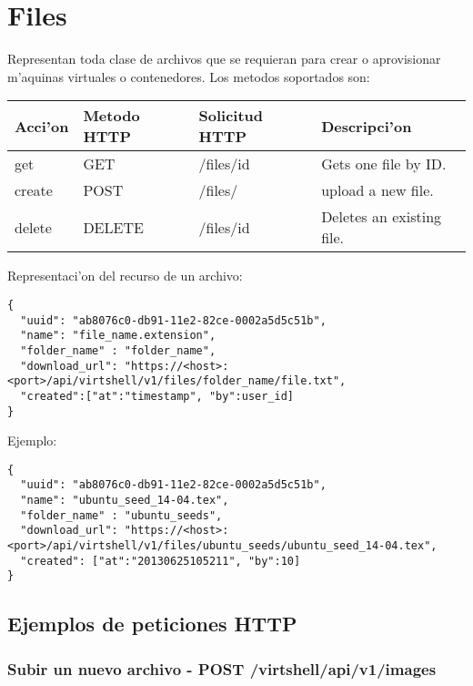 \section{Files}
Representan toda clase de archivos que se requieran para crear o aprovisionar m'aquinas virtuales o contenedores. Los metodos soportados son:

\begin{center}
 \begin{tabular}{| l | l | l | l |}
 \hline
  \rowcolor{blueapi}
  \textbf{Acci'on} & \textbf{Metodo HTTP} & \textbf{Solicitud HTTP} & \textbf{Descripci'on} \\ [0.5ex] 
  \hline\hline
  get & GET & /files/id & Gets one file by ID. \\
  \hline
  create & POST & /files/ & upload a new file. \\
  \hline
  delete & DELETE & /files/id & Deletes an existing file. \\ [1ex]
  \hline
\end{tabular}
\end{center}

\vspace{1cm}
Representaci'on del recurso de un archivo:
\vspace{1cm}

\begin{lstlisting}[style=json]
{
  "uuid": "ab8076c0-db91-11e2-82ce-0002a5d5c51b",
  "name": "file_name.extension",
  "folder_name" : "folder_name",
  "download_url": "https://<host>:<port>/api/virtshell/v1/files/folder_name/file.txt",
  "created":["at":"timestamp", "by":user_id]
}
\end{lstlisting}

Ejemplo:

\medskip
\begin{lstlisting}[style=json]
{
  "uuid": "ab8076c0-db91-11e2-82ce-0002a5d5c51b",
  "name": "ubuntu_seed_14-04.tex",
  "folder_name" : "ubuntu_seeds",
  "download_url": "https://<host>:<port>/api/virtshell/v1/files/ubuntu_seeds/ubuntu_seed_14-04.tex",
  "created": ["at":"20130625105211", "by":10]
}
\end{lstlisting}

\subsection{Ejemplos de peticiones HTTP}

\subsubsection{Subir un nuevo archivo - POST /virtshell/api/v1/images}


